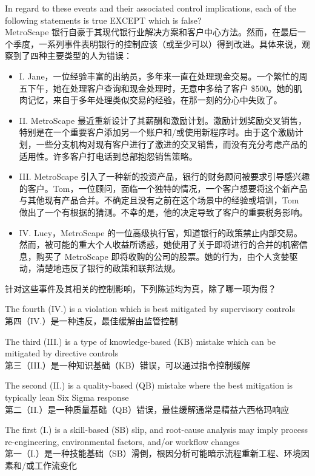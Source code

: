 \documentclass{article}
\newcounter{question} %
\begin{document}
\begin{question}
\begin{itemize}
    \end{itemize}
    In regard to these events and their associated control implications, each of the following statements is true EXCEPT which is false?\\
    MetroScape 银行自豪于其现代银行业解决方案和客户中心方法。然而，在最后一个季度，一系列事件表明银行的控制应该（或至少可以）得到改进。具体来说，观察到了四种主要类型的人为错误：
    \begin{itemize}
        \item I. Jane，一位经验丰富的出纳员，多年来一直在处理现金交易。一个繁忙的周五下午，她在处理客户查询和现金处理时，无意中多给了客户 \$500。她的肌肉记忆，来自于多年处理类似交易的经验，在那一刻的分心中失败了。
        \item II. MetroScape 最近重新设计了其薪酬和激励计划。激励计划奖励交叉销售，特别是在一个重要客户添加另一个账户和/或使用新程序时。由于这个激励计划，一些分支机构对现有客户进行了激进的交叉销售，而没有充分考虑产品的适用性。许多客户打电话到总部抱怨销售策略。
        \item III. MetroScape 引入了一种新的投资产品，银行的财务顾问被要求引导感兴趣的客户。Tom，一位顾问，面临一个独特的情况，一个客户想要将这个新产品与其他现有产品合并。不确定且没有之前在这个场景中的经验或培训，Tom 做出了一个有根据的猜测。不幸的是，他的决定导致了客户的重要税务影响。
        \item IV. Lucy，MetroScape 的一位高级执行官，知道银行的政策禁止内部交易。然而，被可能的重大个人收益所诱惑，她使用了关于即将进行的合并的机密信息，购买了 MetroScape 即将收购的公司的股票。她的行为，由个人贪婪驱动，清楚地违反了银行的政策和联邦法规。
    \end{itemize}
    针对这些事件及其相关的控制影响，下列陈述均为真，除了哪一项为假？
\end{question}

\begin{choices}
    \item The fourth (IV.) is a violation which is best mitigated by supervisory controls\\
    第四（IV.）是一种违反，最佳缓解由监管控制
    \item The third (III.) is a type of knowledge-based (KB) mistake which can be mitigated by directive controls\\
    第三（III.）是一种知识基础（KB）错误，可以通过指令控制缓解
    \item The second (II.) is a quality-based (QB) mistake where the best mitigation is typically lean Six Sigma response\\
    第二（II.）是一种质量基础（QB）错误，最佳缓解通常是精益六西格玛响应
    \item The first (I.) is a skill-based (SB) slip, and root-cause analysis may imply process re-engineering, environmental factors, and/or workflow changes\\
    第一（I.）是一种技能基础（SB）滑倒，根因分析可能暗示流程重新工程、环境因素和/或工作流变化
\end{choices}
\end{document}
